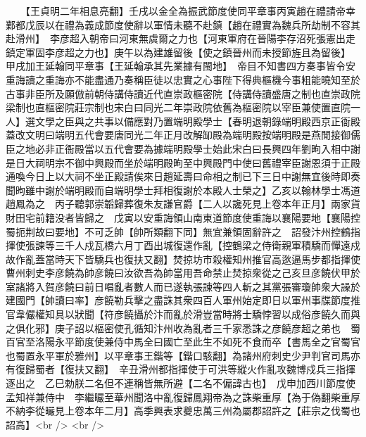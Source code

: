 　　【王貞明二年相息亮翻】壬戌以金全為振武節度使同平章事丙寅趙在禮請帝幸鄴都戊辰以在禮為義成節度使辭以軍情未聽不赴鎮【趙在禮實為魏兵所劫制不容其赴滑州】　李彦超入朝帝曰河東無虞爾之力也【河東軍府在晉陽李存沼死張憲出走鎮定軍固李彦超之力也】庚午以為建雄留後【使之鎮晉州而未授節旌且為留後】　甲戌加王延翰同平章事【王延翰承其先業據有閩地】　帝目不知書四方奏事皆令安重誨讀之重誨亦不能盡通乃奏稱臣徒以忠實之心事陛下得典樞機今事粗能曉知至於古事非臣所及願倣前朝侍講侍讀近代直崇政樞密院【侍講侍讀盛唐之制也直崇政院梁制也直樞密院莊宗制也宋白曰同光二年崇政院依舊為樞密院以宰臣兼使置直院一人】選文學之臣與之共事以備應對乃置端明殿學士【春明退朝錄端明殿西京正衙殿蓋改文明曰端明五代會要唐同光二年正月改解缷殿為端明殿按端明殿是燕閒接御儒臣之地必非正衙殿當以五代會要為據端明殿學士始此宋白曰長興四年劉昫入相中謝是日大祠明宗不御中興殿而坐於端明殿昫至中興殿門中使曰舊禮宰臣謝恩須于正殿通喚今日上以大祠不坐正殿請俟來日趙延壽曰命相之制已下三日中謝無宜後時即奏聞昫雖中謝於端明殿而自端明學士拜相復謝於本殿人士榮之】乙亥以翰林學士馮道趙鳳為之　丙子聽郭崇韜歸葬復朱友謙官爵【二人以讒死見上卷本年正月】兩家貨財田宅前籍没者皆歸之　戊寅以安重誨領山南東道節度使重誨以襄陽要地【襄陽控蜀扼荆故曰要地】不可乏帥【帥所類翻下同】無宜兼領固辭許之　詔發汴州控鶴指揮使張諫等三千人戍瓦橋六月丁酉出城復還作亂【控鶴梁之侍衛親軍積驕而憚遠戍故作亂蓋當時天下皆驕兵也復扶又翻】焚掠坊市殺權知州推官高逖逼馬步都指揮使曹州刺史李彦饒為帥彦饒曰汝欲吾為帥當用吾命禁止焚掠衆從之己亥旦彦饒伏甲於室諸將入賀彦饒曰前日唱亂者數人而已遂執張諫等四人斬之其黨張審瓊帥衆大譟於建國門【帥讀曰率】彦饒勒兵擊之盡誅其衆四百人軍州始定即日以軍州事牒節度推官韋儼權知具以狀聞【符彦饒攝於汴而亂於滑豈當時將士驕悖習以成俗彦饒久而與之俱化邪】庚子詔以樞密使孔循知汴州收為亂者三千家悉誅之彦饒彦超之弟也　蜀百官至洛陽永平節度使兼侍中馬全曰國亡至此生不如死不食而卒【書馬全之官蜀官也蜀置永平軍於雅州】以平章事王鍇等【鍇口駭翻】為諸州府刺史少尹判官司馬亦有復歸蜀者【復扶又翻】　辛丑滑州都指揮使于可洪等縱火作亂攻魏博戍兵三指揮逐出之　乙巳勅朕二名但不連稱皆無所避【二名不偏諱古也】　戊申加西川節度使孟知祥兼侍中　李繼曮至華州聞洛中亂復歸鳳翔帝為之誅柴重厚【為于偽翻柴重厚不納李從曮見上卷本年二月】高季興表求夔忠萬三州為屬郡詔許之【莊宗之伐蜀也詔高】<br />
<br />
